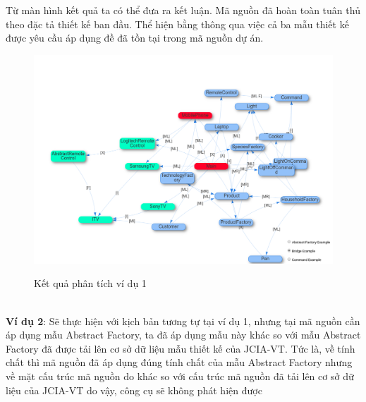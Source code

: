 \documentclass[12pt]{report}
\begin{document}
\noindent Từ màn hình kết quả ta có thể đưa ra kết luận. Mã nguồn đã hoàn toàn tuân thủ theo đặc tả thiết kế ban đầu. Thể hiện bằng thông qua việc cả ba mẫu thiết kế được yêu cầu áp dụng đề đã tồn tại trong mã nguồn dự án.\\
\begin{figure}[h]
	\vspace{-2.5cm}
	\centering
	\includegraphics[scale=0.4]{images/result_example_1}
	\label{fig:result_example_1}
	\caption{Kết quả phân tích ví dụ 1}
\end{figure}\\
\noindent \textbf{Ví dụ 2}: Sẽ thực hiện với kịch bản tương tự tại ví dụ 1, nhưng tại mã nguồn cần áp dụng mẫu Abstract Factory, ta đã áp dụng mẫu này khác so với mẫu Abstract Factory đã được tải lên cơ sở dữ liệu mẫu thiết kế của JCIA-VT. Tức là, về tính chất thì mã nguồn đã áp dụng đúng tính chất của mẫu Abstract Factory nhưng về mặt cấu trúc mã nguồn do khác so với cấu trúc mã nguồn đã tải lên cơ sở dữ liệu của JCIA-VT do vậy, công cụ sẽ không phát hiện được
\end{document}
